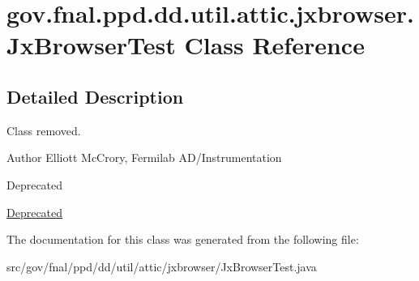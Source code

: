 \hypertarget{classgov_1_1fnal_1_1ppd_1_1dd_1_1util_1_1attic_1_1jxbrowser_1_1JxBrowserTest}{\section{gov.\-fnal.\-ppd.\-dd.\-util.\-attic.\-jxbrowser.\-Jx\-Browser\-Test Class Reference}
\label{classgov_1_1fnal_1_1ppd_1_1dd_1_1util_1_1attic_1_1jxbrowser_1_1JxBrowserTest}
}


\subsection{Detailed Description}
Class removed.

\begin{DoxyAuthor}{Author}
Elliott Mc\-Crory, Fermilab A\-D/\-Instrumentation 
\end{DoxyAuthor}
\begin{DoxyRefDesc}{Deprecated}
\item[\hyperlink{deprecated__deprecated000014}{Deprecated}]\end{DoxyRefDesc}


The documentation for this class was generated from the following file\-:\begin{DoxyCompactItemize}
\item 
src/gov/fnal/ppd/dd/util/attic/jxbrowser/Jx\-Browser\-Test.\-java\end{DoxyCompactItemize}
